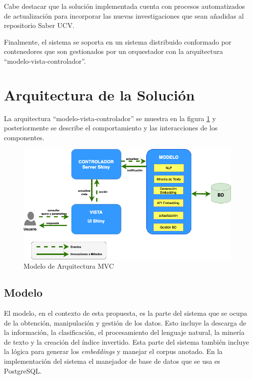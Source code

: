 \documentclass[
  12pt,
  openany]{book}
\begin{document}
Cabe destacar que la solución implementada cuenta con procesos automatizados de actualización para incorporar las nuevas investigaciones que sean añadidas al repositorio Saber UCV.

Finalmente, el sistema se soporta en un sistema distribuido conformado por contenedores que son gestionados por un orquestador con la arquitectura ``modelo-vista-controlador''.

\hypertarget{desarrolloarquitectura}{%
\section{Arquitectura de la Solución}\label{desarrolloarquitectura}}

La arquitectura ``modelo-vista-controlador'' se muestra en la figura \ref{fig:arquitecturamvc} y posteriormente se describe el comportamiento y las interacciones de los componentes.

\begin{figure}

{\centering \includegraphics[width=0.9\linewidth]{images/05-desarrollo/MVC9} 

}

\caption{Modelo de Arquitectura MVC}\label{fig:arquitecturamvc}
\end{figure}

\hypertarget{modelo}{%
\subsection{\texorpdfstring{\textbf{Modelo}}{Modelo}}\label{modelo}}

El modelo\emph{,} en el contexto de esta propuesta, es la parte del sistema que se ocupa de la obtención, manipulación y gestión de los datos. Esto incluye la descarga de la información, la clasificación, el procesamiento del lenguaje natural, la minería de texto y la creación del índice invertido. Esta parte del sistema también incluye la lógica para generar los \emph{embeddings} y manejar el corpus anotado. En la implementación del sistema el manejador de base de datos que se usa es PostgreSQL.
\end{document}
